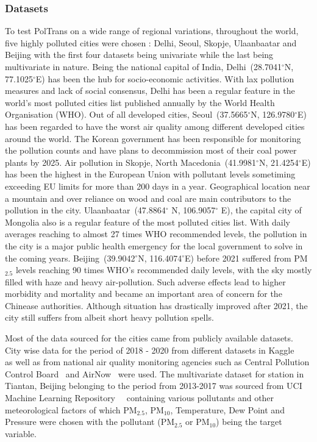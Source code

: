 \documentclass[10pt,journal]{IEEEtran}
\begin{document}
\subsubsection{Datasets} 
To test {PolTrans}  on a wide range of regional variations, throughout the world, five highly polluted cities were chosen : Delhi, Seoul, Skopje, Ulaanbaatar and Beijing with the first four datasets being univariate while the last being multivariate in nature.  Being the national capital of India, Delhi~(28.7041${^{\circ}}$N, 77.1025${^{\circ}}$E) has been the hub for socio-economic activities. With lax pollution measures and lack of social consensus, Delhi has been a regular feature in the world's most polluted cities list published annually by the World Health Organisation (WHO). Out of all developed cities, Seoul~(37.5665${^{\circ}}$N, 126.9780${^{\circ}}$E) has been regarded to have the worst air quality among different developed cities around the world. The Korean government has been responsible for monitoring the pollution counts and have plans to decommission most of their coal power plants by 2025. Air pollution in Skopje, North Macedonia~(41.9981${^{\circ}}$N,  21.4254${^{\circ}}$E) has been the highest in the European Union with pollutant levels sometiming exceeding EU limits for more than 200 days in a year. Geographical location near a mountain and over reliance on wood and coal are main contributors to the pollution in the city. Ulaanbaatar~(47.8864${^{\circ}}$ N, 106.9057${^{\circ}}$ E), the capital city of Mongolia also is a regular feature of the most polluted cities list. With daily averages reaching to almost 27 times WHO recommended levels, the pollution in the city is a major public health emergency for the local government to solve in the coming years.  Beijing~(39.9042${^{\circ}}$N,  116.4074${^{\circ}}$E) before 2021 suffered from PM${_{2.5}}$ levels reaching 90 times WHO's recommended daily levels, with the sky mostly filled with haze and heavy air-pollution. Such adverse effects lead to higher morbidity and mortality and became an important area of concern for the Chinease authorities. Although situation has drastically improved after 2021, the city still suffers from albeit short heavy pollution spells.

Most of the data sourced for the cities came from publicly available datasets. City wise data for the period of 2018 - 2020 from different datasets in Kaggle~\cite{Kaggle.Delhi}~\cite{Kaggle.Seoul}~\cite{Kaggle.Skopje}~\cite{Kaggle.Ulaanbaatar} as well as from national air quality monitoring agencies such as Central Pollution Control Board~\cite{CPCB} and AirNow~\cite{AirNow} were used. The multivariate dataset for station in Tiantan, Beijing belonging to the period from 2013-2017 was sourced from UCI Machine Learning Repository~\cite{UCI.2017}~\cite{Zhang.2017} containing various pollutants and other meteorological factors of which PM${_{2.5}}$, PM${_{10}}$, Temperature, Dew Point and Pressure were chosen with the pollutant (PM${_{2.5}}$ or PM${_{10}}$) being the target variable.
\end{document}
